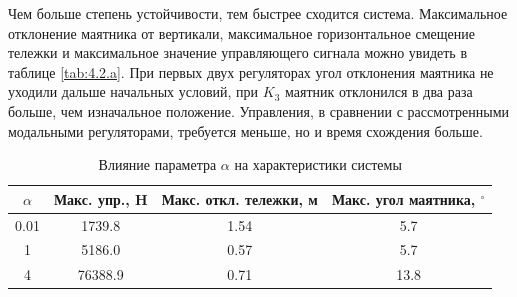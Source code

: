 \noindent Чем больше степень устойчивости, тем быстрее сходится система.
Максимальное отклонение маятника 
от вертикали, максимальное горизонтальное смещение тележки и максимальное 
значение управляющего сигнала можно увидеть в таблице \autoref{tab:4.2.a}.
При первых двух регуляторах угол отклонения маятника не уходили дальше
начальных условий, при $K_3$ маятник отклонился в два раза больше, чем
изначальное положение. Управления, в сравнении с рассмотренными модальными 
регуляторами, требуется меньше, но и время схождения больше.

\begin{table}[H]
    \centering
    \caption{\label{tab:4.2.a}Влияние параметра $\alpha$ на характеристики системы}
    \begin{tabular}{|c|c|c|c|}
        \hline
        $\alpha$ & Макс. упр., H & Макс. откл. тележки, м & Макс. угол маятника, $^\circ$ \\
        \hline
        0.01 & 1739.8   & 1.54  & 5.7   \\
        1    & 5186.0   & 0.57  & 5.7   \\
        4    & 76388.9  & 0.71  & 13.8  \\
        \hline
    \end{tabular}
\end{table}

